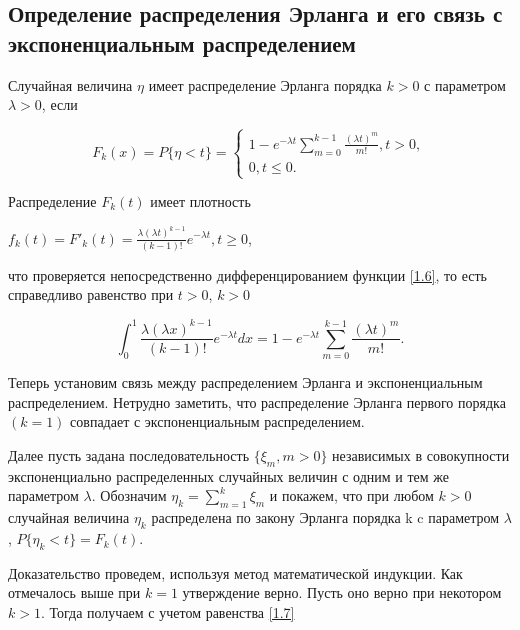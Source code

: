 \subsection{Определение распределения Эрланга и его связь с экспоненциальным распределением}

Случайная величина $\eta$ имеет распределение Эрланга порядка $k>0$ с параметром $\lambda>0$, если

\begin{center}
	
	\begin{equation}
	\label {1.6}
	F_k(x) = P \{\eta<t\} = \begin{cases}1-e^{-\lambda t} \sum_{m=0}^{k-1}\frac{(\lambda t)^m}{m!},t>0,\\0,t\leq0.\end{cases}
	\end{equation} 
\end{center}


Распределение $F_k(t)$ имеет плотность


\begin{center}
	$ f_k(t)= F'_k(t) = \frac{\lambda(\lambda t)^{k-1}}{(k-1)!}e^{-\lambda t},t\geq0$,
\end{center}


что проверяется непосредственно дифференцированием функции \ref{1.6}, то есть справедливо равенство при $t>0$, $k>0$

\begin{center}
	\begin{equation}
	\label{1.7}
	\int_{0}^{1}\frac{\lambda(\lambda x)^{k-1}}{(k-1)!}e^{-\lambda t}dx = 1-e^{-\lambda t} \sum_{m=0}^{k-1}\frac{(\lambda t)^m}{m!}.
	\end{equation}
\end{center} 


Теперь установим связь между распределением Эрланга и экспоненциальным распределением. Нетрудно заметить, что распределение Эрланга первого порядка $(k=1)$ совпадает с экспоненциальным распределением.


Далее пусть задана последовательность $\{\xi_m, m>0\}$ независимых  в совокупности экспоненциально распределенных случайных величин с одним и тем же параметром $\lambda$. Обозначим $\eta_k = \sum_{m=1}^{k}\xi_m$ и покажем, что при любом $k>0$ случайная величина $\eta_k$ распределена по закону Эрланга порядка k c параметром $\lambda$, $P\{\eta_k<t\} = F_k(t)$.

Доказательство проведем, используя метод математической индукции. Как отмечалось выше при $k=1$ утверждение верно. Пусть оно верно при некотором $k>1$. Тогда получаем с учетом равенства \ref{1.7}

